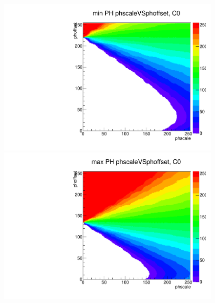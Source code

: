 \begin{figure}[!Hp]
\centering
\begin{minipage}{0.45\textwidth}
  \includegraphics[width=1.0\textwidth]{figures/phopt_minphvsdacdac_th2.pdf}
  \caption{}
  \label{fig:phopt_minphvsdacdac_th2}
\end{minipage}
\hspace{0.3cm}
\begin{minipage}{0.45\textwidth}
  \includegraphics[width=1.0\textwidth]{figures/phopt_maxphvsdacdac_th2.pdf}
  \caption{}
  \label{fig:phopt_maxphvsdacdac_th2}
\end{minipage}
\end{figure}

